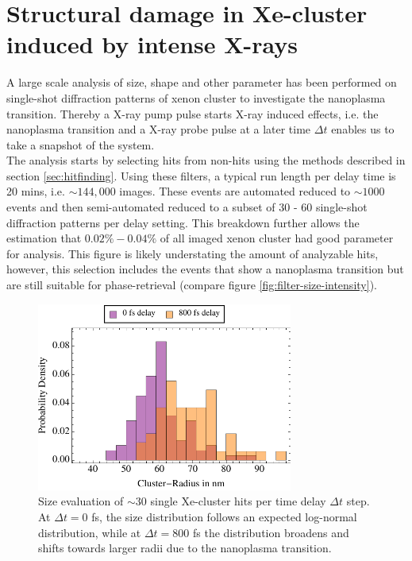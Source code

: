 \section{Structural damage in Xe-cluster induced by intense X-rays}\label{sec:xenon-data}
A large scale analysis of size, shape and other parameter has been performed on single-shot diffraction patterns of xenon cluster to investigate the nanoplasma transition. Thereby a X-ray pump pulse starts X-ray induced effects, i.e. the nanoplasma transition and a X-ray probe pulse at a later time $\Delta t$ enables us to take a snapshot of the system.\\
The analysis starts by selecting hits from non-hits using the methods described in section \ref{sec:hitfinding}. Using these filters, a typical run length per delay time is 20 mins, i.e. $\sim 144,000$ images. These events are automated reduced to $\sim 1000$ events and then semi-automated reduced to a subset of 30 - 60 single-shot diffraction patterns per delay setting. This breakdown further allows the estimation that $0.02\% - 0.04\%$ of all imaged xenon cluster had good parameter for analysis. This figure is likely understating the amount of analyzable hits, however, this selection includes the events that show a nanoplasma transition but are still suitable for phase-retrieval (compare figure \ref{fig:filter-size-intensity}).\\
\begin{figure}
	\centering
		\includegraphics[width=0.75\textwidth]{images/size-distributions.pdf}
	\caption[Single Xe-cluster size distribution at varying time delay $\Delta t$.]{Size evaluation of $\sim 30$ single Xe-cluster hits per time delay $\Delta t$ step. At $\Delta t=0$ fs, the size distribution follows an expected log-normal distribution, while at $\Delta t=800$ fs the distribution broadens and shifts towards larger radii due to the nanoplasma transition.}
	\label{fig:size-distributions}
\end{figure}
